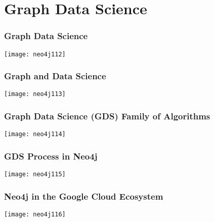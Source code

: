 \section[GDS]{Graph Data Science}

\begin{frame}[fragile]\frametitle{Graph Data Science}

\begin{center}
\texttt{[image: neo4j112]}
\end{center}	  

\end{frame}

\begin{frame}[fragile]\frametitle{Graph and Data Science}

\begin{center}
\texttt{[image: neo4j113]}
\end{center}	  

\end{frame}

\begin{frame}[fragile]\frametitle{Graph Data Science (GDS) Family of Algorithms}

\begin{center}
\texttt{[image: neo4j114]}
\end{center}	  

\end{frame}

\begin{frame}[fragile]\frametitle{GDS Process in Neo4j}

\begin{center}
\texttt{[image: neo4j115]}
\end{center}	  

\end{frame}


\begin{frame}[fragile]\frametitle{Neo4j in the Google Cloud Ecosystem}

\begin{center}
\texttt{[image: neo4j116]}
\end{center}	  

\end{frame}





